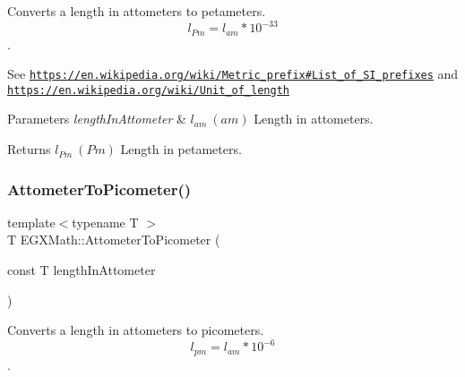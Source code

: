 Converts a length in attometers to petameters. \[ l_{Pm}=l_{am} * 10^{-33} \]. 

See \href{https://en.wikipedia.org/wiki/Metric_prefix#List_of_SI_prefixes}{\tt https\+://en.\+wikipedia.\+org/wiki/\+Metric\+\_\+prefix\#\+List\+\_\+of\+\_\+\+S\+I\+\_\+prefixes} and \href{https://en.wikipedia.org/wiki/Unit_of_length}{\tt https\+://en.\+wikipedia.\+org/wiki/\+Unit\+\_\+of\+\_\+length} 
\begin{DoxyParams}{Parameters}
{\em length\+In\+Attometer} & $ l_{am}\ (am)$ Length in attometers. \\
\hline
\end{DoxyParams}
\begin{DoxyReturn}{Returns}
$ l_{Pm}\ (Pm)$ Length in petameters. 
\end{DoxyReturn}
\mbox{\label{group___e_g_x_math-_conversions-_length_conversions-_attometer-_s_i_ga46ccf47b501bffeb16bc792377e55991}} 
\subsubsection{\texorpdfstring{Attometer\+To\+Picometer()}{AttometerToPicometer()}}
{\footnotesize\ttfamily template$<$typename T $>$ \\
T E\+G\+X\+Math\+::\+Attometer\+To\+Picometer (\begin{DoxyParamCaption}\item[{const T}]{length\+In\+Attometer }\end{DoxyParamCaption})}



Converts a length in attometers to picometers. \[ l_{pm}=l_{am} * 10^{-6} \]. 

